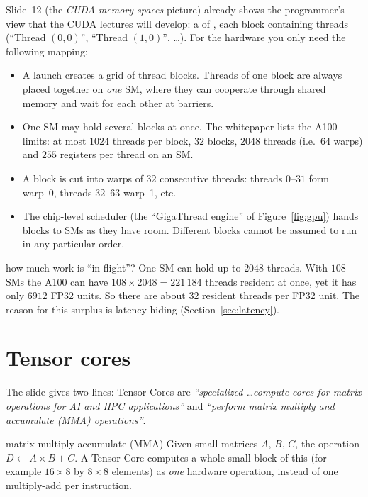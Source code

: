 Slide~12 (the \emph{CUDA memory spaces} picture) already shows the programmer's view that the CUDA lectures
will develop: a  of , each block containing threads (``Thread $(0,0)$'', ``Thread $(1,0)$'', \dots).
For the hardware you only need the following mapping:
\begin{itemize}
  \item A launch creates a grid of thread blocks. Threads of one block are always placed together on \emph{one} SM, where they can cooperate through shared memory and wait for each other at barriers.
  \item One SM may hold several blocks at once. The whitepaper lists the A100 limits: at most $1024$ threads per block, $32$ blocks, $2048$ threads (i.e.\ $64$ warps) and $255$ registers per thread on an SM.
  \item A block is cut into warps of $32$ consecutive threads: threads $0$--$31$ form warp~0, threads $32$--$63$ warp~1, etc.
  \item The chip-level scheduler (the ``GigaThread engine'' of Figure~\ref{fig:gpu}) hands blocks to SMs as they have room. Different blocks cannot be assumed to run in any particular order.
\end{itemize}

\begin{workedex}{how much work is ``in flight''?}
One SM can hold up to $2048$ threads. With $108$ SMs the A100 can have $108\times2048=221\,184$ threads resident at once,
yet it has only $6912$ FP32 units. So there are about $32$ resident threads per FP32 unit. The reason for this surplus is latency hiding (Section~\ref{sec:latency}).
\end{workedex}

\section{Tensor cores}
\label{sec:tensor}


The slide gives two lines: Tensor Cores are \emph{``specialized \dots compute cores for matrix operations for AI and HPC applications''} and \emph{``perform matrix multiply and accumulate (MMA) operations''}.

\begin{definition}{matrix multiply-accumulate (MMA)}
Given small matrices $A$, $B$, $C$, the operation $D\leftarrow A\times B+C$. A Tensor Core computes a whole small block of this (for example
$16\times8$ by $8\times8$ elements) as \emph{one} hardware operation, instead of one multiply-add per instruction.
\end{definition}

